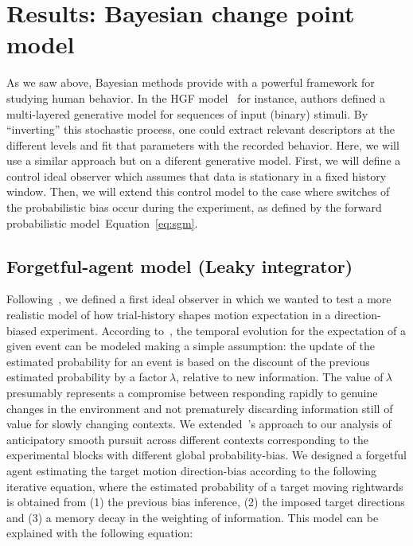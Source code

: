 \documentclass[profile,final,english, draft]{article}%
\newcommand{\citep}[1]{\parencite{#1}}
\newcommand{\citet}[1]{\textcite{#1}}
\newcommand{\seeEq}[1]{Equation~\ref{eq:#1}}
\begin{document}
\section{Results: Bayesian change point model}
\label{sec:bayesian_change_point}
As we saw above, Bayesian methods provide with
a powerful framework for studying human behavior.
In the HGF model~\citep{Matthys2011} for instance,
authors defined a multi-layered generative model for 
sequences of input (binary) stimuli.
By ``inverting'' this stochastic process,
one could extract relevant descriptors at the different levels
and fit that parameters with the recorded behavior. 
Here, we will use a similar approach but on a diferent generative model.
First, we will define a control ideal observer
which assumes that data is stationary in a fixed history window.
Then, we will extend this control model to the case 
where switches of the probabilistic bias occur during the experiment, 
as defined by the forward probabilistic model~\seeEq{sgm}.


\subsection{Forgetful-agent model (Leaky integrator)}
Following~\citep{Maus2015}, 
we defined a first ideal observer
 in which we wanted to test a more realistic model of how trial-history shapes motion expectation in a direction-biased experiment.  According to~\citet{Anderson2006}, the temporal evolution for the expectation of a given event can be modeled making a simple assumption: the update of the estimated probability for an event is based on the discount of the previous estimated probability by a factor$~\lambda$, relative to new information. The value of$~\lambda$ presumably represents a compromise between responding rapidly to genuine changes in the environment and not prematurely discarding information still of value for slowly changing contexts. We extended~\citet{Anderson2006}'s approach to our analysis of anticipatory smooth pursuit across different contexts corresponding to the experimental blocks with different global probability-bias.
We designed a forgetful agent estimating the target motion direction-bias according to the following iterative equation, where the estimated probability of a target moving rightwards is obtained from (1) the previous bias inference, (2) the imposed target directions and (3) a memory decay in the weighting of information. This model can be explained with the following equation:
\end{document}
